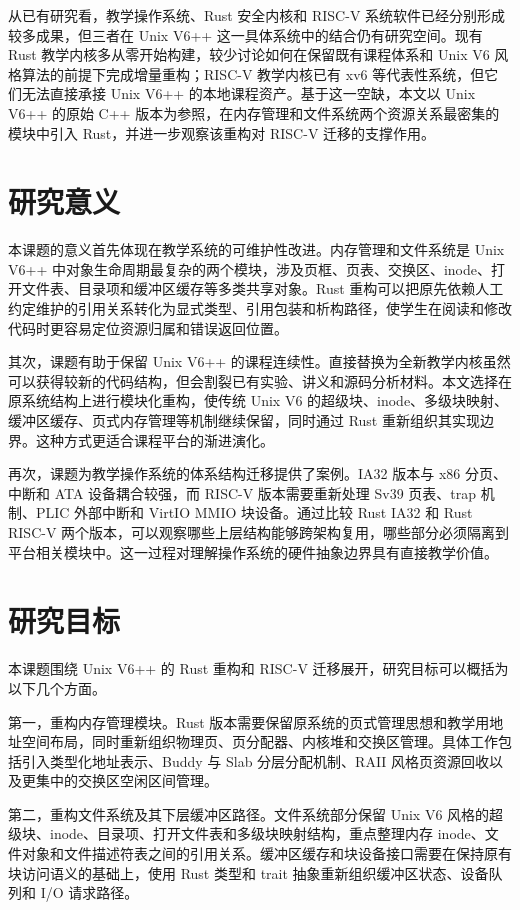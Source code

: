 从已有研究看，教学操作系统、Rust 安全内核和 RISC-V 系统软件已经分别形成较多成果，但三者在 Unix V6++ 这一具体系统中的结合仍有研究空间。现有 Rust 教学内核多从零开始构建，较少讨论如何在保留既有课程体系和 Unix V6 风格算法的前提下完成增量重构；RISC-V 教学内核已有 xv6 等代表性系统，但它们无法直接承接 Unix V6++ 的本地课程资产。基于这一空缺，本文以 Unix V6++ 的原始 C++ 版本为参照，在内存管理和文件系统两个资源关系最密集的模块中引入 Rust，并进一步观察该重构对 RISC-V 迁移的支撑作用。

\section{研究意义}

本课题的意义首先体现在教学系统的可维护性改进。内存管理和文件系统是 Unix V6++ 中对象生命周期最复杂的两个模块，涉及页框、页表、交换区、inode、打开文件表、目录项和缓冲区缓存等多类共享对象。Rust 重构可以把原先依赖人工约定维护的引用关系转化为显式类型、引用包装和析构路径，使学生在阅读和修改代码时更容易定位资源归属和错误返回位置。

其次，课题有助于保留 Unix V6++ 的课程连续性。直接替换为全新教学内核虽然可以获得较新的代码结构，但会割裂已有实验、讲义和源码分析材料。本文选择在原系统结构上进行模块化重构，使传统 Unix V6 的超级块、inode、多级块映射、缓冲区缓存、页式内存管理等机制继续保留，同时通过 Rust 重新组织其实现边界。这种方式更适合课程平台的渐进演化。

再次，课题为教学操作系统的体系结构迁移提供了案例。IA32 版本与 x86 分页、中断和 ATA 设备耦合较强，而 RISC-V 版本需要重新处理 Sv39 页表、trap 机制、PLIC 外部中断和 VirtIO MMIO 块设备。通过比较 Rust IA32 和 Rust RISC-V 两个版本，可以观察哪些上层结构能够跨架构复用，哪些部分必须隔离到平台相关模块中。这一过程对理解操作系统的硬件抽象边界具有直接教学价值。

\section{研究目标}

本课题围绕 Unix V6++ 的 Rust 重构和 RISC-V 迁移展开，研究目标可以概括为以下几个方面。

第一，重构内存管理模块。Rust 版本需要保留原系统的页式管理思想和教学用地址空间布局，同时重新组织物理页、页分配器、内核堆和交换区管理。具体工作包括引入类型化地址表示、Buddy 与 Slab 分层分配机制、RAII 风格页资源回收以及更集中的交换区空闲区间管理。

第二，重构文件系统及其下层缓冲区路径。文件系统部分保留 Unix V6 风格的超级块、inode、目录项、打开文件表和多级块映射结构，重点整理内存 inode、文件对象和文件描述符表之间的引用关系。缓冲区缓存和块设备接口需要在保持原有块访问语义的基础上，使用 Rust 类型和 trait 抽象重新组织缓冲区状态、设备队列和 I/O 请求路径。

